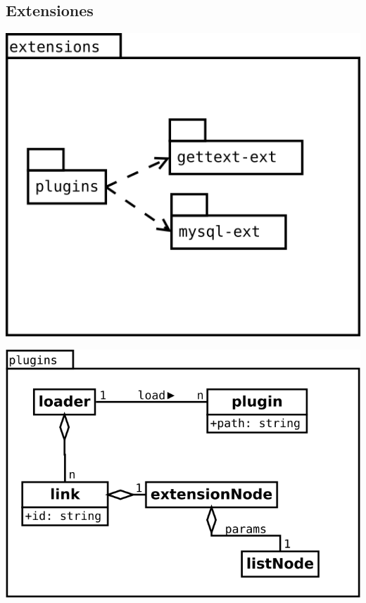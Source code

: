 \pagebreak
\subsection {Extensiones} 
\begin{center}
\includegraphics[scale=0.4]{extensions-package.png} \\
\end{center}

\begin{center}
\includegraphics[scale=0.4]{plugins.png} \\
\end{center}

